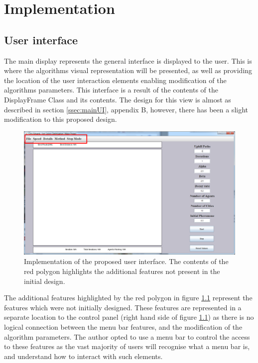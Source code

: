 \chapter{Implementation}

\section{User interface}
\label{mainimp}
The main display represents the general interface is displayed to the user. This is where the algorithms visual representation will be presented, as well as providing the location of the user interaction elements enabling modification of the algorithms parameters. This interface is a result of the contents of the DisplayFrame Class and its contents. The design for this view is almost as described in section \ref{ssec:mainUI}, appendix B, however, there has been a slight modification to this proposed design.

\begin{figure}[H]
\centering
\includegraphics[scale=0.35]{Images/chapter4/displayFrame}
\caption{Implementation of the proposed user interface. The contents of the red polygon highlights the additional features not present in the initial design.}
\label{fig:displayFrameImp}
\end{figure}

The additional features highlighted by the red polygon in figure \ref{fig:displayFrameImp} represent the features which were not initially designed. These features are represented in a separate location to the control panel (right hand side of figure \ref{fig:displayFrameImp}) as there is no logical connection between the menu bar features, and the modification of the algorithm parameters. The author opted to use a menu bar to control the access to these features as the vast majority of users will recognise what a menu bar is, and understand how to interact with such elements. 

